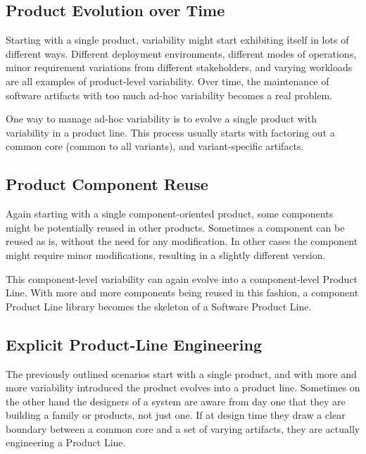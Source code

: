 \documentclass[11pt]{article}
\begin{document}
\subsection{Product Evolution over Time}

Starting with a single product, variability might start exhibiting itself in lots of different ways. Different deployment environments, different modes of operations, minor requirement variations from different stakeholders, and varying workloads are all examples of product-level variability. Over time, the maintenance of software artifacts with too much ad-hoc variability becomes a real problem. 

One way to manage ad-hoc variability is to evolve a single product with variability in a product line. This process usually starts with factoring out a common core (common to all variants), and variant-specific artifacts.

\subsection{Product Component Reuse}

Again starting with a single component-oriented product, some components might be potentially reused in other products. Sometimes a component can be reused as is, without the need for any modification. In other cases the component might require minor modifications, resulting in a slightly different version. 

This component-level variability can again evolve into a component-level Product Line. With more and more components being reused in this fashion, a component Product Line library becomes the skeleton of a Software Product Line.

\subsection{Explicit Product-Line Engineering}

The previously outlined scenarios start with a single product, and with more and more variability introduced the product evolves into a product line. Sometimes on the other hand the designers of a system are aware from day one that they are building a family or products, not just one. If at design time they draw a clear boundary between a common core and a set of varying artifacts, they are actually engineering a Product Line.
\end{document}
